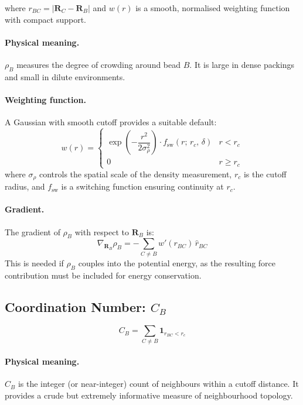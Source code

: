 \documentclass[11pt]{article}
\begin{document}
where $r_{BC} = |\mathbf{R}_C - \mathbf{R}_B|$ and $w(r)$ is a smooth,
normalised weighting function with compact support.

\paragraph{Physical meaning.}
$\rho_B$ measures the degree of crowding around bead $B$.  It is large in
dense packings and small in dilute environments.

\paragraph{Weighting function.}
A Gaussian with smooth cutoff provides a suitable default:
\begin{equation}
    w(r) = \begin{cases}
        \exp\!\left(-\dfrac{r^2}{2\sigma_\rho^2}\right)
        \cdot f_{\mathrm{sw}}(r;\, r_c,\, \delta)
        & r < r_c \\[4pt]
        0 & r \geq r_c
    \end{cases}
\end{equation}
where $\sigma_\rho$ controls the spatial scale of the density measurement,
$r_c$ is the cutoff radius, and $f_{\mathrm{sw}}$ is a switching function
ensuring continuity at $r_c$.

\paragraph{Gradient.}
The gradient of $\rho_B$ with respect to $\mathbf{R}_B$ is:
\begin{equation}
    \nabla_{\mathbf{R}_B} \rho_B
    = -\sum_{C \neq B} w'(r_{BC})\, \hat{r}_{BC}
\end{equation}
This is needed if $\rho_B$ couples into the potential energy, as the
resulting force contribution must be included for energy conservation.

\subsection{Coordination Number: $C_B$}

\begin{equation}
    C_B = \sum_{C \neq B} \mathbf{1}_{r_{BC} < r_c}
\end{equation}

\paragraph{Physical meaning.}
$C_B$ is the integer (or near-integer) count of neighbours within a cutoff
distance.  It provides a crude but extremely informative measure of
neighbourhood topology.
\end{document}
